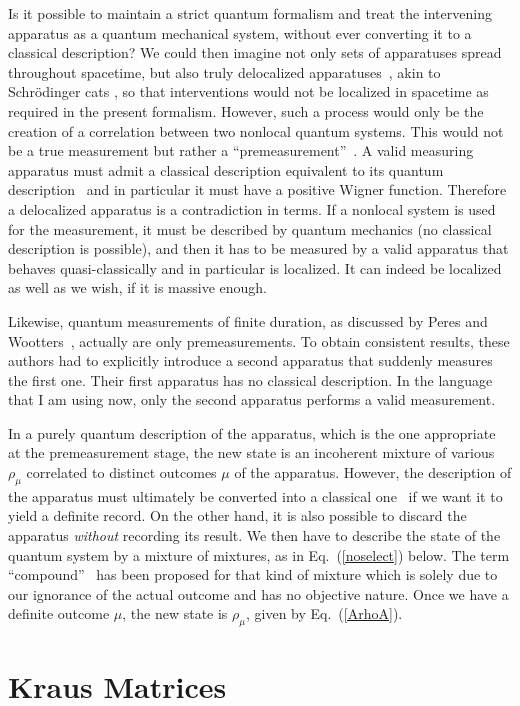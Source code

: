 \documentclass[12pt]{article}
\def\Eq{Eq.~(\ref}
\begin{document}
Is it possible to maintain a strict quantum formalism and treat the
intervening apparatus as a quantum mechanical system, without ever
converting it to a classical description? We could then imagine not only
sets of apparatuses spread throughout spacetime, but also truly
delocalized apparatuses~\cite{AA80}, akin to Schr\"odinger cats
\cite{monroe,placek}, so that interventions would not be localized in
spacetime as required in the present formalism. However, such a process
would only be the creation of a correlation between two nonlocal quantum
systems. This would not be a true measurement but rather a
``premeasurement''~\cite{undo}. A valid measuring apparatus must admit a
classical description equivalent to its quantum description~\cite{hay}
and in particular it must have a positive Wigner function. Therefore a
delocalized apparatus is a contradiction in terms. If a nonlocal system
is used for the measurement, it must be described by quantum mechanics
(no classical description is possible), and then it has to be measured
by a valid apparatus that behaves quasi-classically and in particular is
localized. It can indeed be localized as well as we wish, if it is
massive enough.

Likewise, quantum measurements of finite duration, as discussed by Peres
and Wootters~\cite{PW85}, actually are only premeasurements. To obtain
consistent results, these authors had to explicitly introduce a second
apparatus that suddenly measures the first one. Their first apparatus
has no classical description. In the language that I am using now, only
the second apparatus performs a valid measurement.

In a purely quantum description of the apparatus, which is the one
appropriate at the premeasurement stage, the new state is an incoherent
mixture of various $\rho_\mu$ correlated to distinct outcomes $\mu$ of
the apparatus. However, the description of the apparatus must ultimately
be converted into a classical one~\cite{Bohr1939,hay} if we want it to
yield a definite record. On the other hand, it is also possible to
discard the apparatus {\it without\/} recording its result. We then have
to describe the state of the quantum system by a mixture of mixtures, as
in \Eq{noselect}) below. The term ``compound''~\cite{marlow} has been
proposed for that kind of mixture which is solely due to our ignorance
of the actual outcome and has no objective nature. Once we have a
definite outcome $\mu$, the new state is $\rho_\mu$, given by
\Eq{ArhoA}).

\section{Kraus Matrices}
\end{document}
